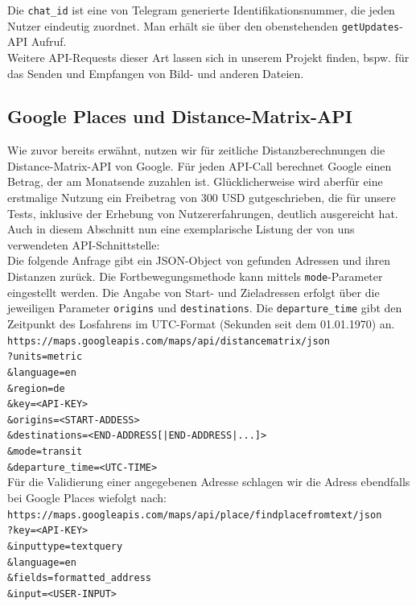 Die \texttt{chat\_id} ist eine von Telegram generierte Identifikationsnummer, die jeden Nutzer eindeutig zuordnet. Man erhält sie über den obenstehenden \texttt{getUpdates}-API Aufruf.\\

Weitere API-Requests dieser Art lassen sich in unserem Projekt finden, bspw. für das Senden und Empfangen von Bild- und anderen Dateien.


\subsection{Google Places und Distance-Matrix-API}
Wie zuvor bereits erwähnt, nutzen wir für zeitliche Distanzberechnungen die Distance-Matrix-API von Google. Für jeden API-Call berechnet Google einen Betrag, der am Monatsende zuzahlen ist. Glücklicherweise wird aberfür eine erstmalige Nutzung ein Freibetrag von 300 USD gutgeschrieben, die für unsere Tests, inklusive der Erhebung von Nutzererfahrungen, deutlich ausgereicht hat.\\
Auch in diesem Abschnitt nun eine exemplarische Listung der von uns verwendeten API-Schnittstelle:\\

Die folgende Anfrage gibt ein JSON-Object von gefunden Adressen und ihren Distanzen zurück. Die Fortbewegungsmethode kann mittels \texttt{mode}-Parameter eingestellt werden. Die Angabe von Start- und Zieladressen erfolgt über die jeweiligen Parameter \texttt{origins} und \texttt{destinations}. Die \texttt{departure\_time} gibt den Zeitpunkt des Losfahrens im UTC-Format (Sekunden seit dem 01.01.1970) an.\\

\texttt{https://maps.googleapis.com/maps/api/distancematrix/json\\?units=metric\\\&language=en\\\&region=de\\\&key=<API-KEY>\\\&origins=<START-ADDESS>\\\&destinations=<END-ADDRESS[|END-ADDRESS|...]>\\\&mode=transit\\\&departure\_time=<UTC-TIME>}\\

Für die Validierung einer angegebenen Adresse schlagen wir die Adress ebendfalls bei Google Places wiefolgt nach:\\

\texttt{https://maps.googleapis.com/maps/api/place/findplacefromtext/json\\?key=<API-KEY>\\\&inputtype=textquery\\\&language=en\\\&fields=formatted\_address\\\&input=<USER-INPUT>}\\

